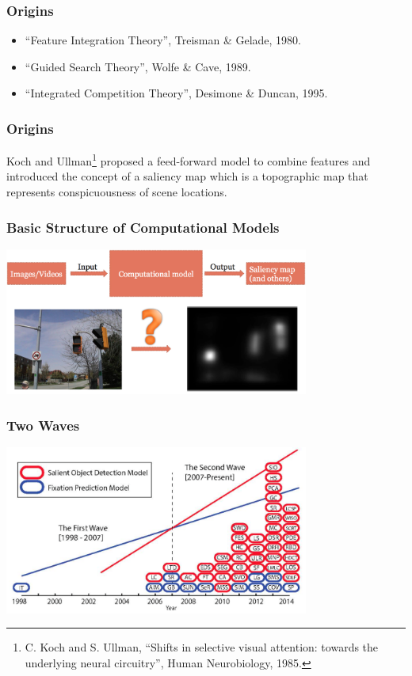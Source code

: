 \documentclass[notheorems,serif,table,compress]{beamer}  %
\begin{document}
\begin{frame}
\frametitle{Origins}
\begin{itemize}
\item ``Feature Integration Theory'', Treisman \& Gelade, 1980.
\item ``Guided Search Theory'', Wolfe \& Cave, 1989.
\item ``Integrated Competition Theory'', Desimone \& Duncan, 1995.
\end{itemize}
\end{frame}


\begin{frame}
\frametitle{Origins}
Koch and Ullman\footnote{C. Koch and S. Ullman, ``Shifts in selective visual attention: towards the underlying neural circuitry'', Human Neurobiology, 1985.} proposed a feed-forward model to combine features and introduced the concept of a saliency map which is a topographic map that represents conspicuousness of scene locations.
\end{frame}


\begin{frame}
\frametitle{Basic Structure of Computational Models}
\centering\includegraphics[width=10cm]{BasicStructure.jpg}
\end{frame}


\begin{frame}
\frametitle{Two Waves}
\centering\includegraphics[width=10cm]{wave}
\end{frame}
\end{document}
